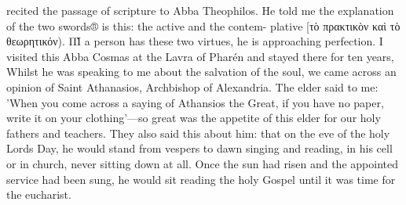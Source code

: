 recited the passage of scripture to Abba Theophilos.
He told me the
explanation of the two swords® is this: the active and the contem-
plative [τὸ πρακτικὸν καὶ τὸ θεωρητικόν).
ΠῚ a person
has these two virtues, he is approaching perfection.
I visited this
Abba Cosmas at the Lavra of Pharén and stayed there for ten
years, Whilst he was speaking to me about the salvation of the soul,
we came across an opinion of Saint Athanasios, Archbishop of
Alexandria.
The elder said to me: 'When you come across a saying
of Athansios the Great, if you have no paper, write it on your
clothing'—so great was the appetite of this elder for our holy fathers
and teachers.
They also said this about him: that on the eve of the
holy Lord\textquotesingle s Day, he would stand from vespers to dawn singing and
reading, in his cell or in church, never sitting down at all.
Once the
sun had risen and the appointed service had been sung, he would sit
reading the holy Gospel until it was time for the eucharist.

